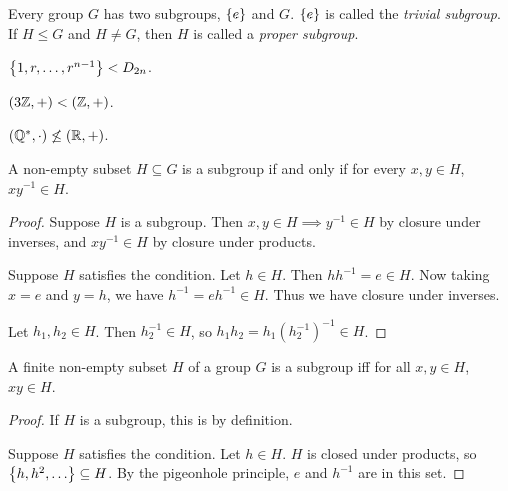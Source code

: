 \begin{examples}
    \item Every group $G$ has two subgroups, $\set{e}$ and $G$.
    $\set{e}$ is called the \emph{trivial subgroup}.
    If $H \le G$ and $H \ne G$, then $H$ is called a \emph{proper
    subgroup}.
    \item $\set{1, r, \dots, r^{n-1}} < D_{2n}$.
    \item $(3\mathbb{Z}, +) < (\mathbb{Z}, +)$.
    \item $(\mathbb{Q}^*, \cdot) \not\le (\mathbb{R}, +)$.
\end{examples}

\begin{proposition}
    A non-empty subset $H \subseteq G$ is a subgroup if and only if
    for every $x, y \in H$, $xy^{-1} \in H$.
\end{proposition}
\begin{proof}
    Suppose $H$ is a subgroup.
    Then $x, y \in H \implies y^{-1} \in H$ by closure under inverses,
    and $xy^{-1} \in H$ by closure under products.

    Suppose $H$ satisfies the condition.
    Let $h \in H$.
    Then $h h^{-1} = e \in H$.
    Now taking $x = e$ and $y = h$, we have $h^{-1} = e h^{-1} \in H$.
    Thus we have closure under inverses.

    Let $h_1, h_2 \in H$.
    Then $h_2^{-1} \in H$, so $h_1 h_2 = h_1 {(h_2^{-1})}^{-1} \in H$.
\end{proof}

\begin{exercise}
    A finite non-empty subset $H$ of a group $G$ is a subgroup iff for
    all $x, y \in H$, $xy \in H$.
\end{exercise}
\begin{proof}
    If $H$ is a subgroup, this is by definition.

    Suppose $H$ satisfies the condition.
    Let $h \in H$.
    $H$ is closed under products, so $\set{h, h^2, \dots} \subseteq H$.
    By the pigeonhole principle, $e$ and $h^{-1}$ are in this set.
\end{proof}

